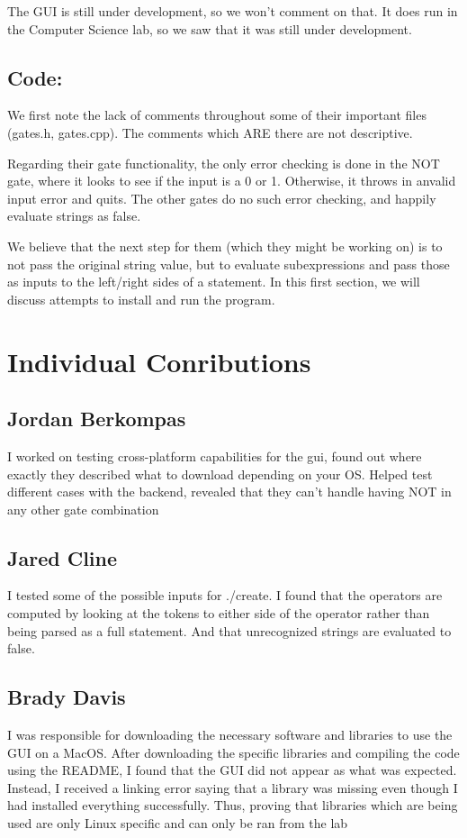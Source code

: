 \documentclass[11pt]{article}
\begin{document}
	The GUI is still under development, so we won't comment on that. It does run in the Computer Science lab, so we saw that it was still under development.

\subsection*{Code:}
	We first note the lack of comments throughout some of their important files (gates.h, gates.cpp). The comments which ARE there are not descriptive. 

	Regarding their gate functionality, the only error checking is done in the NOT gate, where it looks to see if the input is a 0 or 1. Otherwise, it throws in anvalid input error and quits. The other gates do no such error checking, and happily evaluate strings as false.

	We believe that the next step for them (which they might be working on) is to not pass the original string value, but to evaluate subexpressions and pass those as inputs to the left/right sides of a statement.
    In this first section, we will discuss attempts to install and run the program. 

\section*{Individual Conributions}
\subsection*{Jordan Berkompas}
    I worked on testing cross-platform capabilities for the gui, found out where exactly they described what to download depending on your OS. Helped test different cases with the backend, revealed that they can't handle having NOT in any other gate combination
\subsection*{Jared Cline}
I tested some of the possible inputs for ./create. I found that the operators are computed by looking at the tokens to either side of the operator rather than being parsed as a full statement. And that unrecognized strings are evaluated to false. 
\subsection*{Brady Davis}
    I was responsible for downloading the necessary software and libraries to use the GUI on a MacOS. After downloading the specific libraries and compiling the code using the README, I found that the GUI did not appear as what was expected. Instead, I received a linking error saying that a library was missing even though I had installed everything successfully. Thus, proving that libraries which are being used are only Linux specific and can only be ran from the lab
\end{document}

